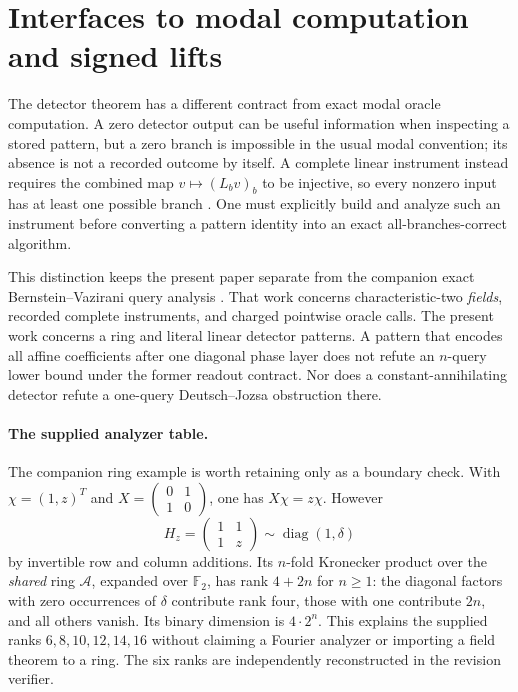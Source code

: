 \documentclass[11pt,a4paper]{article}
\theoremstyle{definition}\newtheorem{definition}[theorem]{Definition}
\theoremstyle{remark}\newtheorem{remark}[theorem]{Remark}
\newcommand{\F}{\mathbb F}
\newcommand{\A}{\mathcal A}
\newcommand{\diag}{\operatorname{diag}}
\numberwithin{equation}{section}
\begin{document}
\section{Interfaces to modal computation and signed lifts}\label{sec:interfaces}
The detector theorem has a different contract from exact modal oracle computation. A zero detector output can be useful information when inspecting a stored pattern, but a zero branch is impossible in the usual modal convention; its absence is not a recorded outcome by itself. A complete linear instrument instead requires the combined map $v\mapsto(L_bv)_b$ to be injective, so every nonzero input has at least one possible branch \cite{Almost}. One must explicitly build and analyze such an instrument before converting a pattern identity into an exact all-branches-correct algorithm.

This distinction keeps the present paper separate from the companion exact Bernstein--Vazirani query analysis \cite{BVCompanion}. That work concerns characteristic-two \emph{fields}, recorded complete instruments, and charged pointwise oracle calls. The present work concerns a ring and literal linear detector patterns. A pattern that encodes all affine coefficients after one diagonal phase layer does not refute an $n$-query lower bound under the former readout contract. Nor does a constant-annihilating detector refute a one-query Deutsch--Jozsa obstruction there.

\paragraph{The supplied analyzer table.}
The companion ring example is worth retaining only as a boundary check. With $\chi=(1,z)^T$ and $X=\left(\begin{smallmatrix}0&1\\1&0\end{smallmatrix}\right)$, one has $X\chi=z\chi$. However
\[
 H_z=\begin{pmatrix}1&1\\1&z\end{pmatrix}\sim\diag(1,\delta)
\]
by invertible row and column additions. Its $n$-fold Kronecker product over the \emph{shared} ring $\A$, expanded over $\F_2$, has rank $4+2n$ for $n\ge1$: the diagonal factors with zero occurrences of $\delta$ contribute rank four, those with one contribute $2n$, and all others vanish. Its binary dimension is $4\cdot2^n$. This explains the supplied ranks $6,8,10,12,14,16$ without claiming a Fourier analyzer or importing a field theorem to a ring. The six ranks are independently reconstructed in the revision verifier.
\end{document}
